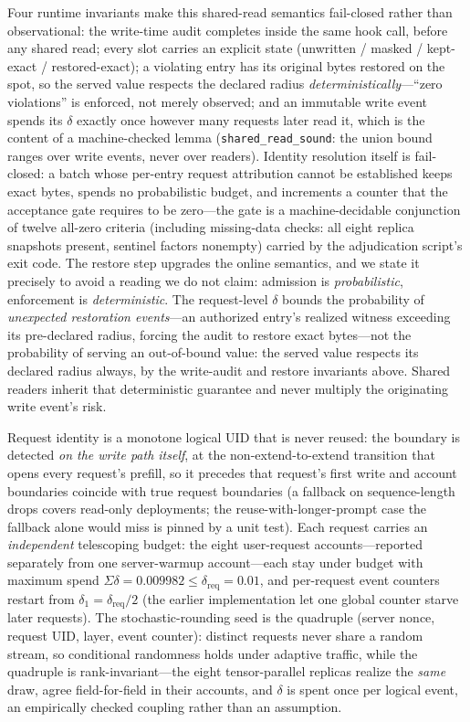 \documentclass[11pt]{article}
\begin{document}
Four runtime
invariants make this shared-read semantics fail-closed rather than
observational: the write-time audit completes inside the same hook call,
before any shared read; every slot carries an explicit state
(unwritten / masked / kept-exact / restored-exact); a violating entry has its
original bytes restored on the spot, so the served value respects the
declared radius \emph{deterministically}---``zero violations'' is enforced,
not merely observed; and an immutable write event spends its $\delta$
exactly once however many requests later read it, which is the content of a
machine-checked lemma (\texttt{shared\_read\_sound}: the union bound ranges
over write events, never over readers). Identity resolution itself is
fail-closed: a batch whose per-entry request attribution cannot be
established keeps exact bytes, spends no probabilistic budget, and increments
a counter that the acceptance gate requires to be zero---the gate is a
machine-decidable conjunction of twelve all-zero criteria (including
missing-data checks: all eight replica snapshots present, sentinel factors
nonempty) carried by the adjudication script's exit code. The restore step
upgrades the online semantics, and we state it precisely to avoid a reading
we do not claim: admission is \emph{probabilistic}, enforcement is
\emph{deterministic}. The request-level $\delta$ bounds the probability of
\emph{unexpected restoration events}---an authorized entry's realized
witness exceeding its pre-declared radius, forcing the audit to restore
exact bytes---not the probability of serving an out-of-bound value: the
served value respects its declared radius always, by the write-audit and
restore invariants above. Shared readers inherit that deterministic
guarantee and never multiply the originating write event's risk.

Request identity is a monotone logical UID that is never
reused: the boundary is detected \emph{on the write path itself}, at the
non-extend-to-extend transition that opens every request's prefill, so it
precedes that request's first write and account boundaries coincide with true
request boundaries (a fallback on sequence-length drops covers read-only
deployments; the reuse-with-longer-prompt case the fallback alone would miss
is pinned by a unit test). Each request carries an \emph{independent}
telescoping budget: the eight user-request accounts---reported separately
from one server-warmup account---each stay under budget with maximum spend
$\Sigma\delta = 0.009982 \le \delta_{\mathrm{req}} = 0.01$, and
per-request event counters restart from $\delta_1 = \delta_{\mathrm{req}}/2$
(the earlier implementation let one global counter starve later requests).
The stochastic-rounding seed is the quadruple (server nonce, request UID,
layer, event counter): distinct requests never share a random stream, so
conditional randomness holds under adaptive traffic, while the quadruple is
rank-invariant---the eight tensor-parallel replicas realize the \emph{same}
draw, agree field-for-field in their accounts, and $\delta$ is spent once
per logical event, an empirically checked coupling rather than an assumption.
\end{document}
